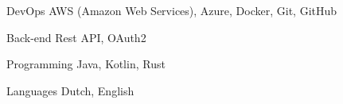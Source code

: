 

\begin{cvskills}

  \cvskill
    {DevOps} %
    {AWS (Amazon Web Services), Azure, Docker, Git, GitHub} %

  \cvskill
    {Back-end} %
    {Rest API, OAuth2} %

  \cvskill
    {Programming} %
    {Java, Kotlin, Rust} %

  \cvskill
    {Languages} %
    {Dutch, English} %

\end{cvskills}

